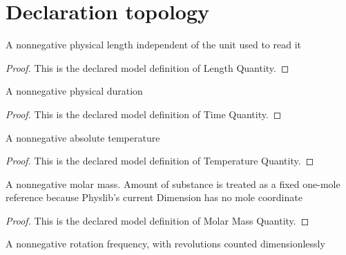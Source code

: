 \section{Declaration topology}
\begin{definition}
  \label{def:physics:phyx-mini-0564:phyxminiproblems-problemphyxmini0564-lengthquantity}
  A nonnegative physical length independent of the unit used to read it
\end{definition}
\begin{proof}
  This is the declared model definition of Length Quantity.
\end{proof}
\begin{definition}
  \label{def:physics:phyx-mini-0564:phyxminiproblems-problemphyxmini0564-timequantity}
  A nonnegative physical duration
\end{definition}
\begin{proof}
  This is the declared model definition of Time Quantity.
\end{proof}
\begin{definition}
  \label{def:physics:phyx-mini-0564:phyxminiproblems-problemphyxmini0564-temperaturequantity}
  A nonnegative absolute temperature
\end{definition}
\begin{proof}
  This is the declared model definition of Temperature Quantity.
\end{proof}
\begin{definition}
  \label{def:physics:phyx-mini-0564:phyxminiproblems-problemphyxmini0564-molarmassquantity}
  A nonnegative molar mass. Amount of substance is treated as a fixed one-mole reference because Physlib's current Dimension has no mole coordinate
\end{definition}
\begin{proof}
  This is the declared model definition of Molar Mass Quantity.
\end{proof}
\begin{definition}
  \label{def:physics:phyx-mini-0564:phyxminiproblems-problemphyxmini0564-rotationfrequencyquantity}
  A nonnegative rotation frequency, with revolutions counted dimensionlessly
\end{definition}
